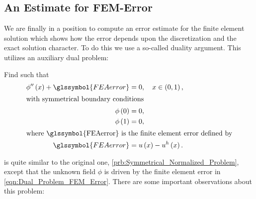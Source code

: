 \subsection[An $L^2$-Norm Estimate for FEA-Error]{An  Estimate for FEM-Error}
We are finally in a position to compute an error estimate for the finite element solution which shows how the error depends upon the
discretization and the exact solution character. To do this we use a so-called duality argument. This utilizes an
auxiliary dual problem:
\begin{problem}	\label{prb:Dual_Problem}
	Find  such that
	\begin{subequations}
		\begin{align}
			\phi^{ \prime \prime } \left( x \right) + \glssymbol{FEAerror} &= 0, \quad x \in \left( 0, 1 \right),	\\
			\intertext{with symmetrical boundary conditions}
			\phi \left( 0 \right) &= 0,	\label{eqn:Dual_Problem_Left_Boundary}	\\
			\phi \left( 1 \right) &= 0,	\label{eqn:Dual_Problem_Right_Boundary}	\\
			\intertext{where \glssymbol{FEAerror} is the finite element error defined by}
			\glssymbol{FEAerror} &= u \left( x \right) - u^h \left( x \right).	\label{eqn:Dual_Problem_FEM_Error}
		\end{align}
	\end{subequations}
\end{problem}
 is quite similar to the original one, \cref{prb:Symmetrical_Normalized_Problem}, except that the unknown
field $\phi$ is driven by the finite element error in \cref{eqn:Dual_Problem_FEM_Error}. There are some important observations
about this problem:
